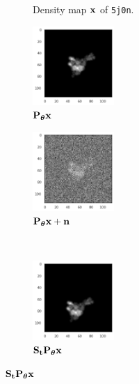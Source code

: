 \begin{figure}[ht!]
\begin{minipage}[b]{0.45\linewidth}
\begin{subfigure}[b]{0.46\linewidth}
            \caption{Density map $\mathbf{x}$ of \texttt{5j0n}.}
        \end{subfigure}
        \caption{%
            Two proteins with different symmetries.
        }\label{fig:pdb-proteins}
    \end{minipage}
    \hfill
    \begin{minipage}[b]{0.45\linewidth}
        \centering
        \begin{subfigure}[b]{0.49\linewidth}
            \centering
            \includegraphics[height=3cm]{figures/5j0n_noise0}
            \caption{$\mathbf{P}_{{\boldsymbol{\theta}}} \mathbf{x}$}
        \end{subfigure}
        \hfill
        \begin{subfigure}[b]{0.49\linewidth}
            \centering
            \includegraphics[height=3cm]{figures/5j0n_noise16}
            \caption{$\mathbf{P}_{{\boldsymbol{\theta}}} \mathbf{x} + \mathbf{n}$}
        \end{subfigure}
        \\ \vspace{0.5em}
        \begin{subfigure}[b]{0.49\linewidth}
            \centering
            \includegraphics[height=3cm]{figures/5j0n_translated}
            \caption{$\mathbf{S}_{\mathbf{t}} \mathbf{P}_{{\boldsymbol{\theta}}} \mathbf{x}$}
        \end{subfigure}
        \hfill

\end{minipage}
\end{figure}
